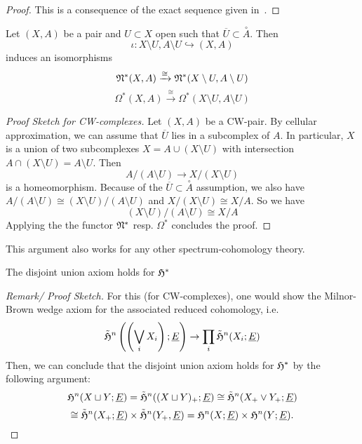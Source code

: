 \documentclass[a4paper,12pt]{article}
\begin{document}
\begin{proof}
    This is a consequence of the exact sequence given in\ \cite[p.261]{spanier}.
\end{proof}

\begin{lemma}[Excision]\label{coexcision}
    Let \((X,A)\) be a pair and \(U\subset X\) open such that \(\overline{U}\subset\overset{\circ}A\). Then \[\iota:X\setminus U,A\setminus U\hookrightarrow(X,A)\]
    induces an isomorphisms
    \[\mathfrak{N}^\ast(X,A)\xrightarrow{\cong}\mathfrak{N}^\ast(X\setminus U,A\setminus U)\]
    \[\Omega^\ast(X,A)\xrightarrow{\cong}\Omega^\ast(X\setminus U,A\setminus U)\]
\end{lemma}

\begin{proof}[Proof Sketch for CW-complexes]\cite[Chapter 6, p.250]{adams}
    Let \((X,A)\) be a CW-pair. By cellular approximation, we can assume that \(\overline{U}\) lies in a subcomplex of \(A\). In particular, \(X\) is a union of two subcomplexes \(X=A\cup(X\setminus U)\) with intersection \(A\cap(X\setminus U)=A\setminus U\). Then
    \[A\big/(A\setminus U)\to X\big/(X\setminus U)\]
    is a homeomorphism. Because of the \(\overline U\subset \overset{\circ}A\) assumption, we also have \(A\big/(A\setminus U)\cong (X\setminus U)\big/(A\setminus U)\) and \(X\big/(X\setminus U)\cong X\big/A\). So we have
    \[(X\setminus U)\big/(A\setminus U)\cong X\big/A\]
    Applying the the functor \(\mathfrak{N}^\ast\) resp. \(\Omega^\ast\) concludes the proof.
\end{proof}

\begin{remark}
    This argument also works for any other spectrum-cohomology theory.
\end{remark}

\begin{lemma}\label{codisjoint}
    The disjoint union axiom holds for \(\mathfrak{H}^\ast\)
\end{lemma}

\begin{proof}[Remark/ Proof Sketch]\cite[Chapter 6]{adams}
    For this (for CW-complexes), one would show the Milnor-Brown wedge axiom for the associated reduced cohomology, i.e.
    \[\tilde{\mathfrak{H}}^n\left(\left(\bigvee_i X_i\right);\underline{E}\right)\to\prod_i\tilde{\mathfrak{H}}^n(X_i;\underline{E})\]
    Then, we can conclude that the disjoint union axiom holds for \(\mathfrak{H}^\ast\) by the following argument:
    \[\mathfrak{H}^n(X\sqcup Y;\underline{E})=\tilde{\mathfrak{H}}^n((X\sqcup Y)_+;\underline{E})\cong\tilde{\mathfrak{H}}^n(X_+\vee Y_+;\underline{E})\]\[\cong\tilde{\mathfrak{H}}^n(X_+;\underline{E})\times\tilde{\mathfrak{H}}^n(Y_+,\underline{E})=\mathfrak{H}^n(X;\underline{E})\times\mathfrak{H}^n(Y;\underline{E}).\]
\end{proof}
\end{document}
